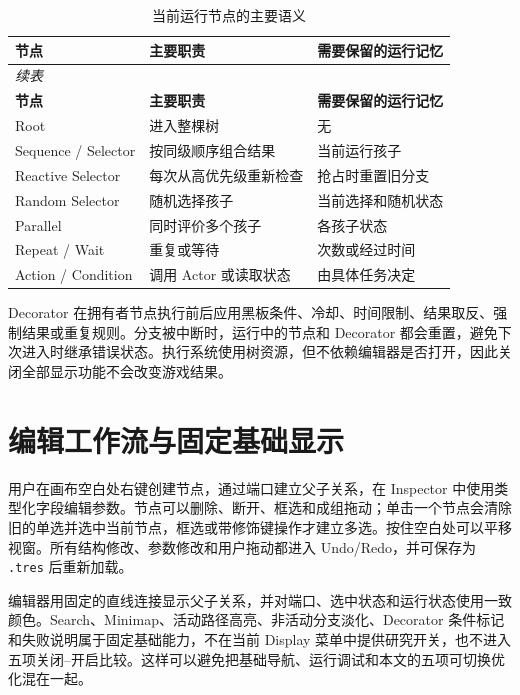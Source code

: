 \documentclass[11pt,a4paper,oneside,extrafontsizes]{memoir}
\begin{document}
\begin{center}
\small
\begin{longtable}{@{}p{} p{} p{}@{}}
\caption{当前运行节点的主要语义}\label{tab:auto-5}\\
\toprule
\textbf{节点} & \textbf{主要职责} & \textbf{需要保留的运行记忆} \\
\midrule
\endfirsthead
\multicolumn{3}{l}{\small\itshape 续表}\\
\toprule
\textbf{节点} & \textbf{主要职责} & \textbf{需要保留的运行记忆} \\
\midrule
\endhead
Root & 进入整棵树 & 无 \\
Sequence / Selector & 按同级顺序组合结果 & 当前运行孩子 \\
Reactive Selector & 每次从高优先级重新检查 & 抢占时重置旧分支 \\
Random Selector & 随机选择孩子 & 当前选择和随机状态 \\
Parallel & 同时评价多个孩子 & 各孩子状态 \\
Repeat / Wait & 重复或等待 & 次数或经过时间 \\
Action / Condition & 调用 Actor 或读取状态 & 由具体任务决定 \\
\bottomrule
\end{longtable}
\end{center}

Decorator 在拥有者节点执行前后应用黑板条件、冷却、时间限制、结果取反、强制结果或重复规则。分支被中断时，运行中的节点和 Decorator 都会重置，避免下次进入时继承错误状态。执行系统使用树资源，但不依赖编辑器是否打开，因此关闭全部显示功能不会改变游戏结果。

\section{编辑工作流与固定基础显示}

用户在画布空白处右键创建节点，通过端口建立父子关系，在 Inspector 中使用类型化字段编辑参数。节点可以删除、断开、框选和成组拖动；单击一个节点会清除旧的单选并选中当前节点，框选或带修饰键操作才建立多选。按住空白处可以平移视窗。所有结构修改、参数修改和用户拖动都进入 Undo/Redo，并可保存为 \texttt{.tres} 后重新加载。

编辑器用固定的直线连接显示父子关系，并对端口、选中状态和运行状态使用一致颜色。Search、Minimap、活动路径高亮、非活动分支淡化、Decorator 条件标记和失败说明属于固定基础能力，不在当前 Display 菜单中提供研究开关，也不进入五项关闭–开启比较。这样可以避免把基础导航、运行调试和本文的五项可切换优化混在一起。
\end{document}
